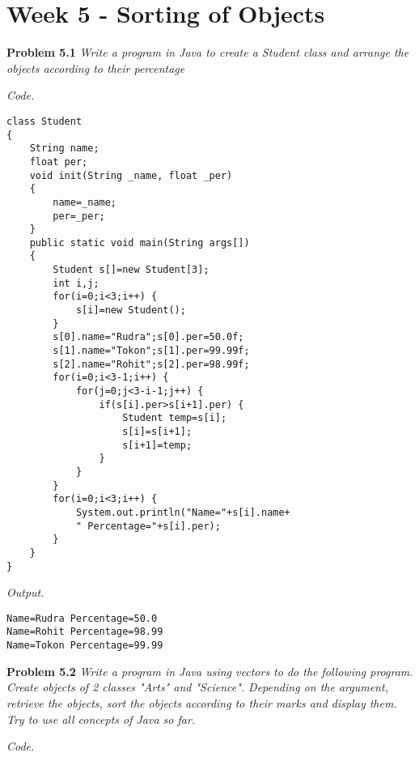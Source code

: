 \documentclass[12pt]{article}
\begin{document}
\newpage

\setlength{\fboxrule}{.5mm}\setlength{\fboxsep}{1.2mm}
\addtolength{\boxlength}{-4mm}
\begin{center}\end{center}
\vspace{5mm}

\section{Week 5 - Sorting of Objects}

\textbf{Problem 5.1} \textit{Write a program in Java to create a Student class and arrange the objects according to their percentage}


\textit{Code.}

\begin{lstlisting}
class Student
{
	String name;
	float per;
	void init(String _name, float _per)
	{
		name=_name;
		per=_per;
	}
	public static void main(String args[])
	{
		Student s[]=new Student[3];
		int i,j;
		for(i=0;i<3;i++) {
			s[i]=new Student();
		}
		s[0].name="Rudra";s[0].per=50.0f;
		s[1].name="Tokon";s[1].per=99.99f;
		s[2].name="Rohit";s[2].per=98.99f;
		for(i=0;i<3-1;i++) {
			for(j=0;j<3-i-1;j++) {
				if(s[i].per>s[i+1].per) {
					Student temp=s[i];
					s[i]=s[i+1];
					s[i+1]=temp;
				}
			}
		}
		for(i=0;i<3;i++) {
			System.out.println("Name="+s[i].name+
			" Percentage="+s[i].per);
		}
	}
}
\end{lstlisting}
\textit{Output.}
\begin{lstlisting}
Name=Rudra Percentage=50.0
Name=Rohit Percentage=98.99
Name=Tokon Percentage=99.99
\end{lstlisting}

\textbf{Problem 5.2} \textit{Write a program in Java using vectors to do the following program. Create objects of 2 classes "Arts" and "Science". Depending on the argument, retrieve the objects, sort the objects according to their marks and display them. Try to use all concepts of Java so far.}


\textit{Code.}
\end{document}
